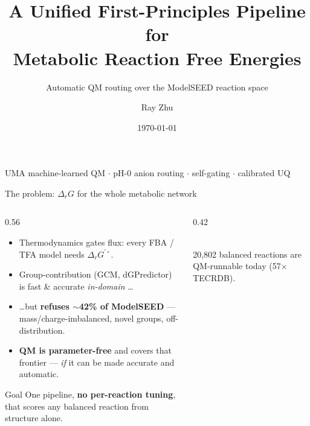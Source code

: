 \documentclass[aspectratio=169,11pt]{beamer}
\title{\bfseries A Unified First-Principles Pipeline for\\Metabolic Reaction Free Energies}
\subtitle{Automatic QM routing over the ModelSEED reaction space}
\author{Ray Zhu}
\date{\today}
\begin{document}
{
\begin{frame}[plain]
  \titlepage
  \begin{center}\small\color{brandgray}
  UMA machine-learned QM \;$\cdot$\; pH-0 anion routing \;$\cdot$\; self-gating \;$\cdot$\; calibrated UQ
  \end{center}
\end{frame}}

\begin{frame}{The problem: $\Delta_r G$ for the whole metabolic network}
  \begin{columns}[T]
    \begin{column}{0.56\textwidth}
      \begin{itemize}
        \item Thermodynamics gates flux: every FBA / TFA model needs $\Delta_r G^{\prime\circ}$.
        \item Group-contribution (GCM, dGPredictor) is fast \& accurate \emph{in-domain} \dots
        \item \dots but \textbf{refuses $\sim$42\% of ModelSEED} — mass/charge-imbalanced, novel groups, off-distribution.
        \item \textbf{QM is parameter-free} and covers that frontier — \emph{if} it can be made accurate and automatic.
      \end{itemize}
      \vspace{0.5em}
      \begin{block}{Goal}
        One pipeline, \textbf{no per-reaction tuning}, that scores any balanced reaction from structure alone.
      \end{block}
    \end{column}
    \begin{column}{0.42\textwidth}
      \centering
      \\[0.3em]{\scriptsize 20{,}802 balanced reactions are QM-runnable today (57$\times$ TECRDB).}
    \end{column}
  \end{columns}
\end{frame}
\end{document}
